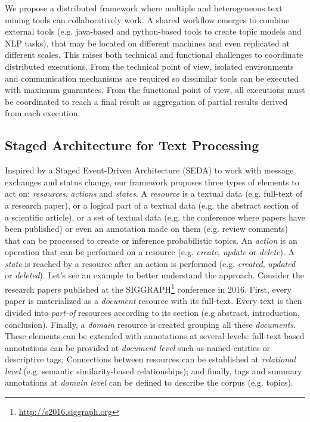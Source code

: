 We propose a distributed framework where multiple and heterogeneous text mining tools can collaboratively work. A shared workflow emerges to combine external tools (e.g. java-based and python-based tools to create topic models and NLP tasks), that may be located on different machines and even replicated at different scales. This raises both technical and functional challenges to coordinate distributed executions. From the technical point of view, isolated environments and communication mechanisms are required so dissimilar tools can be executed with maximum guarantees. From the functional point of view, all executions must be coordinated to reach a final result as aggregation of partial results derived from each execution.


\subsection{Staged Architecture for Text Processing}

Inspired by a Staged Event-Driven Architecture (SEDA) to work with message exchanges and status change, our framework proposes three types of elements to act on: \textit{resources}, \textit{actions} and \textit{states}. A \textit{resource} is a textual data (e.g. full-text of a research paper), or a logical part of a textual data (e.g. the abstract section of a scientific article), or a set of textual data (e.g. the conference where papers have been published) or even an annotation made on them (e.g. review comments) that can be processed to create or inference probabilistic topics. An \textit{action} is an operation that can be performed on a resource (e.g. \textit{create}, \textit{update} or \textit{delete}). A \textit{state} is reached by a resource after an action is performed (e.g. \textit{created}, \textit{updated} or \textit{deleted}). Let's see an example to better understand the approach. Consider the research papers published at the SIGGRAPH\footnote{\url{http://s2016.siggraph.org}} conference in 2016. First, every paper is materialized as a \textit{document} resource with its full-text. Every text is then divided into \textit{part-of} resources according to its section (e.g abstract, introduction, conclusion). Finally, a \textit{domain} resource is created grouping all these \textit{documents}. These elements can be extended with annotations at several levels: full-text based annotations can be provided at \textit{document level} such as named-entities or descriptive tags;  Connections between resources can be established at \textit{relational level} (e.g. semantic similarity-based relationships); and finally, tags and summary annotations at \textit{domain level} can be defined to describe the corpus (e.g. topics).

